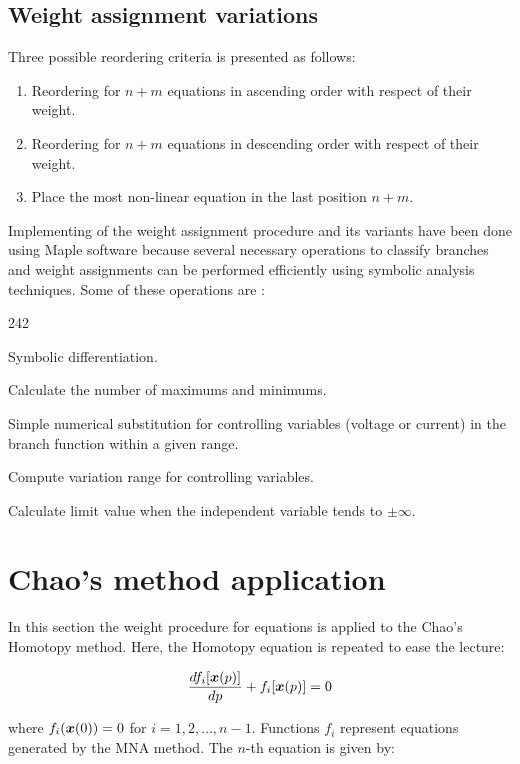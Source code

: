 \documentclass[conference,letterpaper,onecolumn,11pt]{IEEEtran}
\newcommand{\pig}[1]{\mbox{\boldmath ${#1}$}	}
\begin{document}
\subsection{Weight assignment variations}

Three possible reordering criteria is presented as follows:

\begin{enumerate}
\item Reordering for $n+m$ equations in ascending order with respect of their weight.
\item Reordering for $n+m$ equations in descending order with respect of their weight.
\item Place the most non-linear equation in the last position $n+m$.
\end{enumerate}

Implementing of the weight assignment procedure and its variants have been done using Maple software \cite{maple1} because several necessary operations to classify branches and weight assignments can be performed efficiently using symbolic analysis techniques. Some of these operations are \cite{homo_SMACD,homo_ECCTD}:

\begin{dinglist}{242}
\item Symbolic differentiation.
\item Calculate the number of maximums and minimums.
\item Simple numerical substitution for controlling variables (voltage or current) in the branch function within a given range.
\item Compute variation range for controlling variables.
\item Calculate limit value when the independent variable tends to $\pm\infty$.
\end{dinglist}  

\section{Chao's method application}

In this section the weight procedure for equations is applied to the Chao's Homotopy method. Here, the Homotopy equation is repeated to ease the lecture:

\begin{equation}
{ {{d f_i[\pig{x}(p)]} \over{dp}} + f_i[\pig{x}(p)]=0}
\label{chaobis1}
\end{equation}

where $f_i(\pig{x}(0))=0$ for $i=1,2,\ldots,n-1$. Functions $f_i$ represent equations generated by the MNA method. The $n$-th equation is given by:
\end{document}
